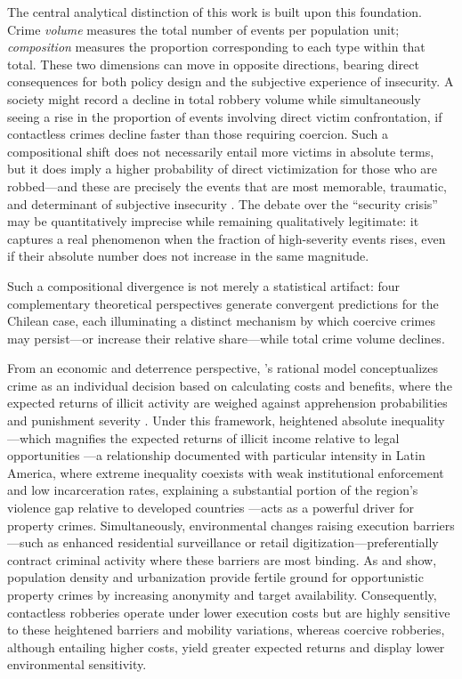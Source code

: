\documentclass[pdflatex,sn-basic]{sn-jnl}
\begin{document}
The central analytical distinction of this work is built upon this foundation. Crime \emph{volume} measures the total number of events per population unit; \emph{composition} measures the proportion corresponding to each type within that total. These two dimensions can move in opposite directions, bearing direct consequences for both policy design and the subjective experience of insecurity. A society might record a decline in total robbery volume while simultaneously seeing a rise in the proportion of events involving direct victim confrontation, if contactless crimes decline faster than those requiring coercion. Such a compositional shift does not necessarily entail more victims in absolute terms, but it does imply a higher probability of direct victimization for those who are robbed---and these are precisely the events that are most memorable, traumatic, and determinant of subjective insecurity \citep{dominguez2024,gamarra2024b}. The debate over the ``security crisis'' may be quantitatively imprecise while remaining qualitatively legitimate: it captures a real phenomenon when the fraction of high-severity events rises, even if their absolute number does not increase in the same magnitude.

Such a compositional divergence is not merely a statistical artifact: four complementary theoretical perspectives generate convergent predictions for the Chilean case, each illuminating a distinct mechanism by which coercive crimes may persist---or increase their relative share---while total crime volume declines.

From an economic and deterrence perspective, \citet{becker1968}'s rational model conceptualizes crime as an individual decision based on calculating costs and benefits, where the expected returns of illicit activity are weighed against apprehension probabilities and punishment severity \citep{han2013,shamugia2024,yin2017}. Under this framework, heightened absolute inequality---which magnifies the expected returns of illicit income relative to legal opportunities \citep{goda2018}---a relationship documented with particular intensity in Latin America, where extreme inequality coexists with weak institutional enforcement and low incarceration rates, explaining a substantial portion of the region's violence gap relative to developed countries \citep{soares2010}---acts as a powerful driver for property crimes. Simultaneously, environmental changes raising execution barriers---such as enhanced residential surveillance or retail digitization---preferentially contract criminal activity where these barriers are most binding. As \citet{harries2006} and \citet{shahid2024} show, population density and urbanization provide fertile ground for opportunistic property crimes by increasing anonymity and target availability. Consequently, contactless robberies operate under lower execution costs but are highly sensitive to these heightened barriers and mobility variations, whereas coercive robberies, although entailing higher costs, yield greater expected returns and display lower environmental sensitivity.
\end{document}

